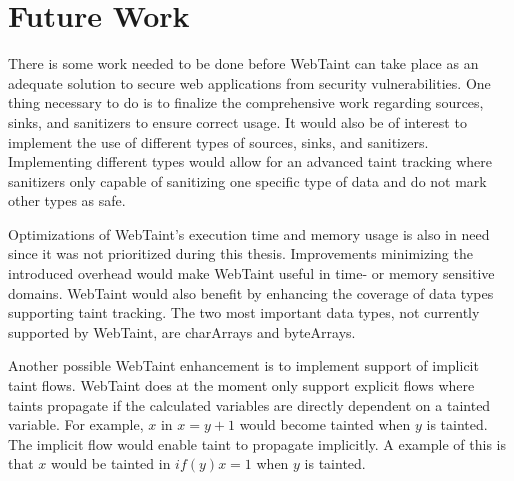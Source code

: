 \chapter{Future Work}
\label{FutureWork}
There is some work needed to be done before WebTaint can take place as an adequate solution to secure web applications from security vulnerabilities. One thing necessary to do is to finalize the comprehensive work regarding sources, sinks, and sanitizers to ensure correct usage. It would also be of interest to implement the use of different types of sources, sinks, and sanitizers. Implementing different types would allow for an advanced taint tracking where sanitizers only capable of sanitizing one specific type of data and do not mark other types as safe. 

Optimizations of WebTaint's execution time and memory usage is also in need since it was not prioritized during this thesis. Improvements minimizing the introduced overhead would make WebTaint useful in time- or memory sensitive domains. WebTaint would also benefit by enhancing the coverage of data types supporting taint tracking. The two most important data types, not currently supported by WebTaint, are charArrays and byteArrays. 

Another possible WebTaint enhancement is to implement support of implicit taint flows. WebTaint does at the moment only support explicit flows where taints propagate if the calculated variables are directly dependent on a tainted variable. For example, $ x $ in $ x = y + 1 $ would become tainted when $ y $ is tainted. The implicit flow would enable taint to propagate implicitly. A example of this is that $ x $ would be tainted in $ if (y) x = 1 $ when $ y $ is tainted.